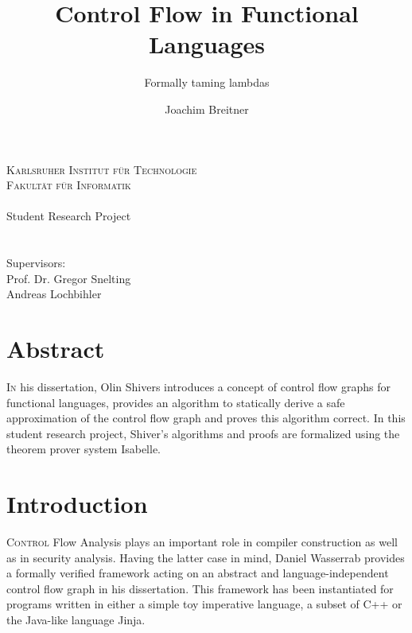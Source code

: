 \documentclass[a4paper,halfparskip,DIV=10,11pt]{scrbook}
\author{Joachim Breitner}
\title{Control Flow in Functional Languages}
\subtitle{Formally taming lambdas}
\begin{document}
\begin{titlepage}
\centering
\makeatletter
\textsc{\Large{Karlsruher Institut für Technologie}}\\
\vspace{.5em}
\textsc{\Large{Fakultät für Informatik}} \\
\vspace{4em}
{\Large \@author} \\
\vspace{2em}
{\large Student Research Project}\\
\vspace{2.5em}
{\sectfont\huge \@title }\\
\vspace{2em}
{\sectfont\Large \@subtitle }\\
\vfill
Supervisors: \\
Prof. Dr. Gregor Snelting \\
Andreas Lochbihler \\
\vspace{2em}
{\large \@date }
\makeatother
\end{titlepage}


\chapter*{Abstract}

\lettrine I{n} his dissertation\cite{Shivers}, Olin Shivers introduces a concept of control flow graphs for functional languages, provides an algorithm to statically derive a safe approximation of the control flow graph and proves this algorithm correct. In this student research project, Shiver’s algorithms and proofs are formalized using the theorem prover system Isabelle.


\tableofcontents

\chapter{Introduction}

\lettrine C{ontrol} Flow Analysis plays an important role in compiler construction as well as in security analysis. Having the latter case in mind, Daniel Wasserrab provides a formally verified framework acting on an abstract and language-independent control flow graph in his dissertation\citep{wasserrab}. This framework has been instantiated for programs written in either a simple toy imperative language, a subset of C++ or the Java-like language Jinja\citep{jinja}.
\end{document}
